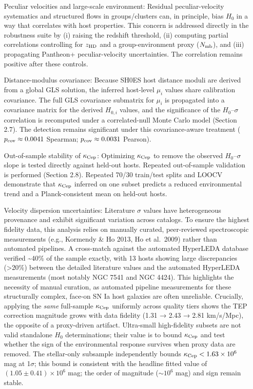 \documentclass[
]{article}
\begin{document}
Peculiar velocities and large-scale environment: Residual
peculiar-velocity systematics and structured flows in groups/clusters
can, in principle, bias \(H_0\) in a way that correlates with host
properties. This concern is addressed directly in the robustness suite
by (i) raising the redshift threshold, (ii) computing partial
correlations controlling for \(z_{\rm HD}\) and a group-environment
proxy (\(N_{\rm mb}\)), and (iii) propagating Pantheon+
peculiar-velocity uncertainties. The correlation remains positive after
these controls.

Distance-modulus covariance: Because SH0ES host distance moduli are
derived from a global GLS solution, the inferred host-level \(\mu_i\)
values share calibration covariance. The full GLS covariance submatrix
for \(\mu_i\) is propagated into a covariance matrix for the derived
\(H_{0,i}\) values, and the significance of the \(H_0\)--\(\sigma\)
correlation is recomputed under a correlated-null Monte Carlo model
(Section 2.7). The detection remains significant under this
covariance-aware treatment (\(p_{\rm cov} \approx 0.0041\) Spearman;
\(p_{\rm cov} \approx 0.0031\) Pearson).

Out-of-sample stability of \(\kappa_{\rm Cep}\): Optimizing
\(\kappa_{\rm Cep}\) to remove the observed \(H_0\)--\(\sigma\) slope is
tested directly against held-out hosts. Repeated out-of-sample
validation is performed (Section 2.8). Repeated 70/30 train/test splits
and LOOCV demonstrate that \(\kappa_{\rm Cep}\) inferred on one subset
predicts a reduced environmental trend and a Planck-consistent mean on
held-out hosts.

Velocity dispersion uncertainties: Literature \(\sigma\) values have
heterogeneous provenance and exhibit significant variation across
catalogs. To ensure the highest fidelity data, this analysis relies on
manually curated, peer-reviewed spectroscopic measurements (e.g.,
Kormendy \& Ho 2013, Ho et al.~2009) rather than automated pipelines. A
cross-match against the automated HyperLEDA database verified
\textasciitilde40\% of the sample exactly, with 13 hosts showing large
discrepancies (\textgreater20\%) between the detailed literature values
and the automated HyperLEDA measurements (most notably NGC 7541 and NGC
4424). This highlights the necessity of manual curation, as automated
pipeline measurements for these structurally complex, face-on SN Ia host
galaxies are often unreliable. Crucially, applying the \emph{same}
full-sample \(\kappa_{\rm Cep}\) uniformly across quality tiers shows
the TEP correction magnitude grows with data fidelity (1.31 → 2.43 →
2.81 km/s/Mpc), the opposite of a proxy-driven artifact. Ultra-small
high-fidelity subsets are not valid standalone \(H_0\) determinations;
their value is to bound \(\kappa_{\rm Cep}\) and test whether the sign
of the environmental response survives when proxy data are removed. The
stellar-only subsample independently bounds
\(\kappa_{\rm Cep} < 1.63\times10^6\) mag at 1\(\sigma\); this bound is
consistent with the headline fitted value of \((1.05\pm0.41)\times10^6\)
mag; the order of magnitude (\(\sim10^6\) mag) and sign remain stable.
\end{document}
